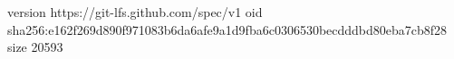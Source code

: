 version https://git-lfs.github.com/spec/v1
oid sha256:e162f269d890f971083b6da6afe9a1d9fba6c0306530becdddbd80eba7cb8f28
size 20593
